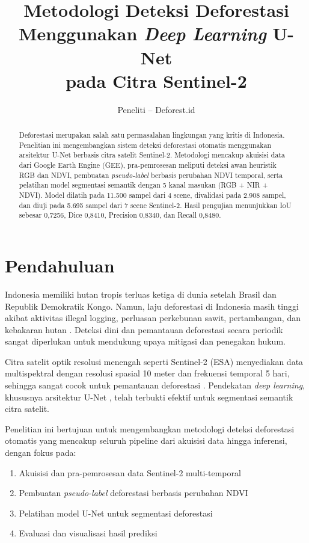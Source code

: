 \documentclass[12pt,a4paper]{article}
\title{\textbf{Metodologi Deteksi Deforestasi} \\
        Menggunakan \textit{Deep Learning} U-Net \\
        pada Citra Sentinel-2}
\author{Peneliti -- Deforest.id}
\date{}
\begin{document}
\maketitle
\thispagestyle{empty}

\begin{abstract}
Deforestasi merupakan salah satu permasalahan lingkungan yang kritis di Indonesia. 
Penelitian ini mengembangkan sistem deteksi deforestasi otomatis menggunakan arsitektur 
U-Net berbasis citra satelit Sentinel-2. Metodologi mencakup akuisisi data dari Google 
Earth Engine (GEE), pra-pemrosesan meliputi deteksi awan heuristik RGB dan NDVI, 
pembuatan \textit{pseudo-label} berbasis perubahan NDVI temporal, serta pelatihan 
model segmentasi semantik dengan 5 kanal masukan (RGB + NIR + NDVI). Model dilatih 
pada 11.500 sampel dari 4 scene, divalidasi pada 2.908 sampel, dan diuji pada 5.695 
sampel dari 7 scene Sentinel-2. Hasil pengujian menunjukkan IoU sebesar 0,7256, 
Dice 0,8410, Precision 0,8340, dan Recall 0,8480.
\end{abstract}

\section{Pendahuluan}
\label{sec:pendahuluan}

Indonesia memiliki hutan tropis terluas ketiga di dunia setelah Brasil dan 
Republik Demokratik Kongo. Namun, laju deforestasi di Indonesia masih tinggi 
akibat aktivitas illegal logging, perluasan perkebunan sawit, pertambangan, 
dan kebakaran hutan \cite{fao2020}. Deteksi dini dan pemantauan deforestasi 
secara periodik sangat diperlukan untuk mendukung upaya mitigasi dan penegakan 
hukum.

Citra satelit optik resolusi menengah seperti Sentinel-2 (ESA) menyediakan data 
multispektral dengan resolusi spasial 10 meter dan frekuensi temporal 5 hari, 
sehingga sangat cocok untuk pemantauan deforestasi \cite{drusch2012sentinel}. 
Pendekatan \textit{deep learning}, khususnya arsitektur U-Net \cite{ronneberger2015unet}, 
telah terbukti efektif untuk segmentasi semantik citra satelit.

Penelitian ini bertujuan untuk mengembangkan metodologi deteksi deforestasi 
otomatis yang mencakup seluruh pipeline dari akuisisi data hingga inferensi, 
dengan fokus pada:

\begin{enumerate}[nosep]
    \item Akuisisi dan pra-pemrosesan data Sentinel-2 multi-temporal
    \item Pembuatan \textit{pseudo-label} deforestasi berbasis perubahan NDVI
    \item Pelatihan model U-Net untuk segmentasi deforestasi
    \item Evaluasi dan visualisasi hasil prediksi
\end{enumerate}
\end{document}

